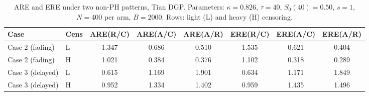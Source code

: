 \begin{table}[ht]
\centering
\small
\caption{ARE and ERE under two non-PH patterns, Tian DGP.
  Parameters: $\kappa=0.826$, $\tau=40$, $S_0(40)=0.50$, $s=1$,
  $N=400$ per arm, $B=2000$.
  Rows: light (L) and heavy (H) censoring.}
\label{tab:main-sim-nonph}
\setlength{\tabcolsep}{4pt}
\begin{tabular}{llcccccc}
\hline
Case & Cens & ARE(R/C) & ARE(A/C) & ARE(A/R) & ERE(R/C) & ERE(A/C) & ERE(A/R) \\
\hline
Case 2 (fading) & L & 1.347 & 0.686 & 0.510 & 1.535 & 0.621 & 0.404 \\
Case 2 (fading) & H & 1.021 & 0.384 & 0.376 & 1.102 & 0.318 & 0.289 \\
Case 3 (delayed) & L & 0.615 & 1.169 & 1.901 & 0.634 & 1.171 & 1.849 \\
Case 3 (delayed) & H & 0.952 & 1.334 & 1.402 & 0.959 & 1.435 & 1.496 \\
\hline
\end{tabular}
\end{table}
